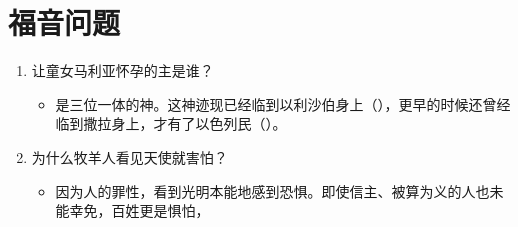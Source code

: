\section{福音问题}

\begin{enumerate}
  \item \label{cpt1:que:1}让童女马利亚怀孕的主是谁？
  \begin{itemize}
    \item 是三位一体的神。这神迹现已经临到以利沙伯身上（），更早的时候还曾经临到撒拉身上，才有了以色列民（）。
  \end{itemize}
  \item \label{cpt1:que:2}为什么牧羊人看见天使就害怕？
  \begin{itemize}
    \item 因为人的罪性，看到光明本能地感到恐惧。即使信主、被算为义的人也未能幸免，百姓更是惧怕，
  \end{itemize}
\end{enumerate}

\renewcommand{\bibname}{本章参考}

